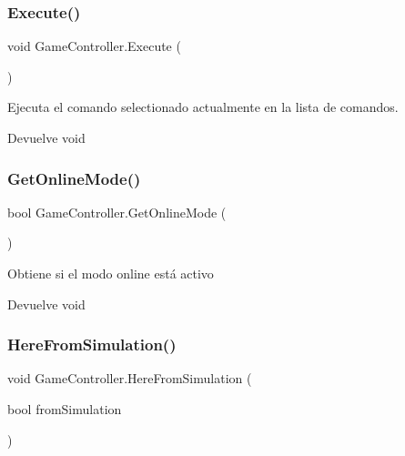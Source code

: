 \subsubsection{\texorpdfstring{Execute()}{Execute()}}
{\footnotesize\ttfamily void Game\+Controller.\+Execute (\begin{DoxyParamCaption}{ }\end{DoxyParamCaption})\hspace{0.3cm}{\ttfamily [inline]}}

Ejecuta el comando selectionado actualmente en la lista de comandos. \begin{DoxyReturn}{Devuelve}
void 
\end{DoxyReturn}
\mbox{\label{class_game_controller_ab8bc597c4e47a3cece068762cdfaf33a}} 
\subsubsection{\texorpdfstring{GetOnlineMode()}{GetOnlineMode()}}
{\footnotesize\ttfamily bool Game\+Controller.\+Get\+Online\+Mode (\begin{DoxyParamCaption}{ }\end{DoxyParamCaption})\hspace{0.3cm}{\ttfamily [inline]}}

Obtiene si el modo online está activo \begin{DoxyReturn}{Devuelve}
void 
\end{DoxyReturn}
\mbox{\label{class_game_controller_a6ac352c2a0b3dafb1da0a71fb047736e}} 
\subsubsection{\texorpdfstring{HereFromSimulation()}{HereFromSimulation()}}
{\footnotesize\ttfamily void Game\+Controller.\+Here\+From\+Simulation (\begin{DoxyParamCaption}\item[{bool}]{from\+Simulation }\end{DoxyParamCaption})\hspace{0.3cm}{\ttfamily [inline]}}

